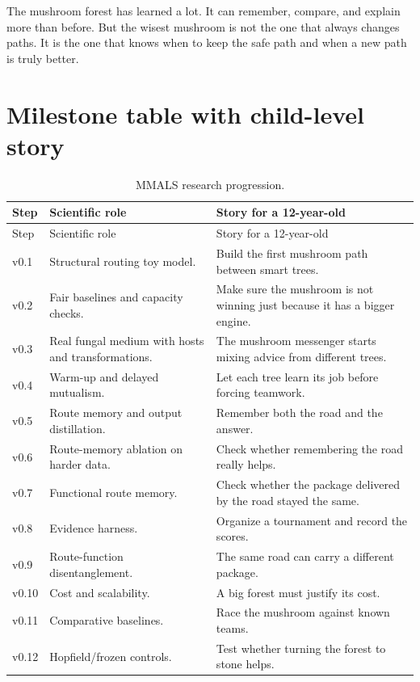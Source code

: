 \documentclass[11pt]{article}
\begin{document}
\begin{kidbox}
The mushroom forest has learned a lot. It can remember, compare, and explain more than before. But the wisest mushroom is not the one that always changes paths. It is the one that knows when to keep the safe path and when a new path is truly better.
\end{kidbox}

\appendix
\section{Milestone table with child-level story}

\begin{longtable}{p{}p{}p{}}
\caption{MMALS research progression.}\\
\toprule
Step & Scientific role & Story for a 12-year-old \\
\midrule
\endfirsthead
\toprule
Step & Scientific role & Story for a 12-year-old \\
\midrule
\endhead
v0.1 & Structural routing toy model. & Build the first mushroom path between smart trees. \\
v0.2 & Fair baselines and capacity checks. & Make sure the mushroom is not winning just because it has a bigger engine. \\
v0.3 & Real fungal medium with hosts and transformations. & The mushroom messenger starts mixing advice from different trees. \\
v0.4 & Warm-up and delayed mutualism. & Let each tree learn its job before forcing teamwork. \\
v0.5 & Route memory and output distillation. & Remember both the road and the answer. \\
v0.6 & Route-memory ablation on harder data. & Check whether remembering the road really helps. \\
v0.7 & Functional route memory. & Check whether the package delivered by the road stayed the same. \\
v0.8 & Evidence harness. & Organize a tournament and record the scores. \\
v0.9 & Route-function disentanglement. & The same road can carry a different package. \\
v0.10 & Cost and scalability. & A big forest must justify its cost. \\
v0.11 & Comparative baselines. & Race the mushroom against known teams. \\
v0.12 & Hopfield/frozen controls. & Test whether turning the forest to stone helps. \\

\end{longtable}
\end{document}

